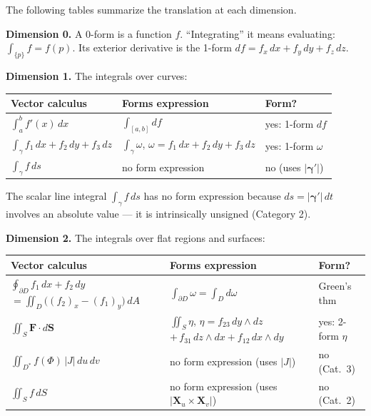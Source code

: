 \documentclass[11pt]{report}
\begin{document}
The following tables summarize the translation at each dimension.

\medskip

\noindent\textbf{Dimension 0.} A 0-form is a function $f$. ``Integrating'' it means evaluating: $\int_{\{p\}} f = f(p)$. Its exterior derivative is the 1-form $df = f_x\,dx + f_y\,dy + f_z\,dz$.

\medskip

\noindent\textbf{Dimension 1.} The integrals over curves:

\begin{center}
\renewcommand{\arraystretch}{1.4}
\begin{tabular}{|l|l|l|}
\hline
\textbf{Vector calculus} & \textbf{Forms expression} & \textbf{Form?} \\
\hline
$\int_a^b f'(x)\,dx$ & $\int_{[a,b]} df$ & yes: 1-form $df$ \\
\hline
$\int_\gamma f_1\,dx + f_2\,dy + f_3\,dz$ & $\int_\gamma \omega$, \; $\omega = f_1\,dx + f_2\,dy + f_3\,dz$ & yes: 1-form $\omega$ \\
\hline
$\int_\gamma f\,ds$ & no form expression & no (uses $|\boldsymbol{\gamma}'|$) \\
\hline
\end{tabular}
\end{center}

The scalar line integral $\int_\gamma f\,ds$ has no form expression because $ds = |\boldsymbol{\gamma}'|\,dt$ involves an absolute value --- it is intrinsically unsigned (Category 2).

\medskip

\noindent\textbf{Dimension 2.} The integrals over flat regions and surfaces:

\begin{center}
\renewcommand{\arraystretch}{1.4}
\small
\begin{tabular}{|p{4.5cm}|p{6.5cm}|l|}
\hline
\textbf{Vector calculus} & \textbf{Forms expression} & \textbf{Form?} \\
\hline
$\oint_{\partial D} f_1\,dx + f_2\,dy$ \newline $= \iint_D \big((f_2)_x - (f_1)_y\big)\,dA$ & $\int_{\partial D} \omega = \int_D d\omega$ & Green's thm \\
\hline
$\iint_S \mathbf{F} \cdot d\mathbf{S}$ & $\iint_S \eta$, \; $\eta = f_{23}\,dy \wedge dz$ \newline $+ \, f_{31}\,dz \wedge dx + f_{12}\,dx \wedge dy$ & yes: 2-form $\eta$ \\
\hline
$\iint_{D^*} f(\Phi)\,|J|\,du\,dv$ & no form expression (uses $|J|$) & no (Cat.\ 3) \\
\hline
$\iint_S f\,dS$ & no form expression (uses $|\mathbf{X}_u \times \mathbf{X}_v|$) & no (Cat.\ 2) \\
\hline
\end{tabular}
\normalsize
\end{center}
\end{document}
